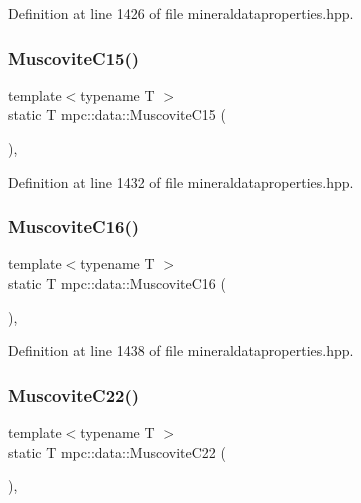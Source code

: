 Definition at line 1426 of file mineraldataproperties.\+hpp.

\mbox{\label{namespacempc_1_1data_a1bc5ce35e2ccafd1b037989ff055ba54}} 
\subsubsection{\texorpdfstring{Muscovite\+C15()}{MuscoviteC15()}}
{\footnotesize\ttfamily template$<$typename T $>$ \\
static T mpc\+::data\+::\+Muscovite\+C15 (\begin{DoxyParamCaption}{ }\end{DoxyParamCaption})\hspace{0.3cm}{\ttfamily [inline]}, {\ttfamily [static]}}



Definition at line 1432 of file mineraldataproperties.\+hpp.

\mbox{\label{namespacempc_1_1data_adb6cdc3b5eca19baf752048f96d679f1}} 
\subsubsection{\texorpdfstring{Muscovite\+C16()}{MuscoviteC16()}}
{\footnotesize\ttfamily template$<$typename T $>$ \\
static T mpc\+::data\+::\+Muscovite\+C16 (\begin{DoxyParamCaption}{ }\end{DoxyParamCaption})\hspace{0.3cm}{\ttfamily [inline]}, {\ttfamily [static]}}



Definition at line 1438 of file mineraldataproperties.\+hpp.

\mbox{\label{namespacempc_1_1data_a2963c13ae8e2e4ae7a99fc20b391e017}} 
\subsubsection{\texorpdfstring{Muscovite\+C22()}{MuscoviteC22()}}
{\footnotesize\ttfamily template$<$typename T $>$ \\
static T mpc\+::data\+::\+Muscovite\+C22 (\begin{DoxyParamCaption}{ }\end{DoxyParamCaption})\hspace{0.3cm}{\ttfamily [inline]}, {\ttfamily [static]}}



